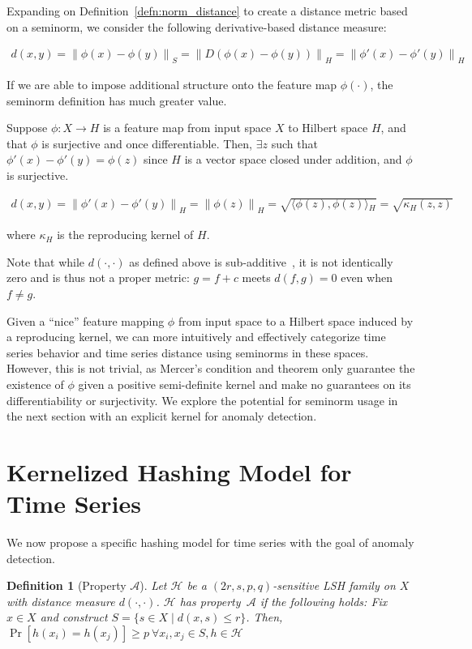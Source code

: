 \documentclass[a4paper]{article}
\newcommand{\norm}[1]{\left\lVert#1\right\rVert}
\newcommand{\innerproduct}[2]{\langle{}#1,#2\rangle{}}
\theoremstyle{def}
\newtheorem{definition}{Definition}
\theoremstyle{thm}
\newcommand{\LSH}[0]{\mathcal{H}}
\begin{document}
Expanding on Definition~\ref{defn:norm_distance} to create a distance metric based on a seminorm, we consider the following derivative-based distance measure:

\begin{align}
    d(x,y) = \norm{\phi(x)-\phi(y)}_S = \norm{D (\phi(x) - \phi(y))}_H = \norm{\phi'(x) - \phi'(y)}_H
\end{align}

If we are able to impose additional structure onto the feature map $\phi(\cdot)$, the seminorm definition has much greater value.

Suppose $\phi \colon X \rightarrow H$ is a feature map from input space $X$ to Hilbert space $H$, and that $\phi$ is surjective and once differentiable.
Then, $\exists z$ such that $\phi'(x) - \phi'(y) = \phi(z)$ since $H$ is a vector space closed under addition, and $\phi$ is surjective.

\begin{align}
    d(x,y) = \norm{\phi'(x) - \phi'(y)}_H = \norm{\phi(z)}_H = \sqrt{\innerproduct{\phi(z)}{\phi(z)}_H} = \sqrt{\kappa_H(z,z)}
\end{align}

where $\kappa_H$ is the reproducing kernel of $H$.

Note that while $d(\cdot,\cdot)$ as defined above is sub-additive~\cite{rosenlicht68-realanalysis}, it is not identically zero and is thus not a proper metric: $g = f + c$ meets $d(f,g) = 0$ even when $f \neq g$.

Given a ``nice'' feature mapping $\phi$ from input space to a Hilbert space induced by a reproducing kernel, we can more intuitively and effectively categorize time series behavior and time series distance using seminorms in these spaces.
However, this is not trivial, as Mercer's condition and theorem only guarantee the existence of $\phi$ given a positive semi-definite kernel and make no guarantees on its differentiability or surjectivity.
We explore the potential for seminorm usage in the next section with an explicit kernel for anomaly detection.

\section{Kernelized Hashing Model for Time Series}
\label{sec:kernel_hashing}

We now propose a specific hashing model for time series with the goal of anomaly detection.

\begin{definition}[Property $\mathscr{A}$]\label{defn:property_alpha}
    Let $\LSH$ be a $(2r, s, p, q)$-sensitive LSH family on $X$ with distance measure $d(\cdot, \cdot)$.
    $\LSH$ has property~$\mathscr{A}$ if the following holds:
    Fix $x \in X$ and construct $S = \{s \in X \mid d(x,s) \le r\}$.
    Then, $\Pr[h(x_i) = h(x_j)] \ge p~\forall x_i, x_j \in S, h \in \LSH$ 
\end{definition}
\end{document}
